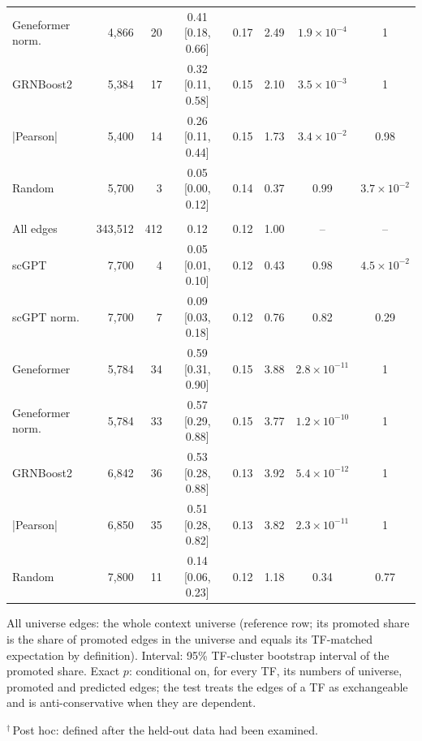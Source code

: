\begin{table}[tbp]
\begin{tabular}{@{}lrrcrccc@{}}
Geneformer norm. & 4{,}866 & 20 & 0.41 [0.18, 0.66] & 0.17 & 2.49 & $1.9\times 10^{-4}$ & 1 \\
GRNBoost2 & 5{,}384 & 17 & 0.32 [0.11, 0.58] & 0.15 & 2.10 & $3.5\times 10^{-3}$ & 1 \\
|Pearson| & 5{,}400 & 14 & 0.26 [0.11, 0.44] & 0.15 & 1.73 & $3.4\times 10^{-2}$ & 0.98 \\
Random & 5{,}700 & 3 & 0.05 [0.00, 0.12] & 0.14 & 0.37 & 0.99 & $3.7\times 10^{-2}$ \\
\addlinespace[3pt]
\multicolumn{8}{@{}l}{\emph{Lung}} \\
All edges & 343{,}512 & 412 & 0.12 & 0.12 & 1.00 & -- & -- \\
scGPT & 7{,}700 & 4 & 0.05 [0.01, 0.10] & 0.12 & 0.43 & 0.98 & $4.5\times 10^{-2}$ \\
scGPT norm. & 7{,}700 & 7 & 0.09 [0.03, 0.18] & 0.12 & 0.76 & 0.82 & 0.29 \\
Geneformer & 5{,}784 & 34 & 0.59 [0.31, 0.90] & 0.15 & 3.88 & $2.8\times 10^{-11}$ & 1 \\
Geneformer norm. & 5{,}784 & 33 & 0.57 [0.29, 0.88] & 0.15 & 3.77 & $1.2\times 10^{-10}$ & 1 \\
GRNBoost2 & 6{,}842 & 36 & 0.53 [0.28, 0.88] & 0.13 & 3.92 & $5.4\times 10^{-12}$ & 1 \\
|Pearson| & 6{,}850 & 35 & 0.51 [0.28, 0.82] & 0.13 & 3.82 & $2.3\times 10^{-11}$ & 1 \\
Random & 7{,}800 & 11 & 0.14 [0.06, 0.23] & 0.12 & 1.18 & 0.34 & 0.77 \\
\bottomrule
\end{tabular}
\par\smallskip
\begin{minipage}{\linewidth}\footnotesize
All universe edges: the whole context universe (reference row; its promoted share is the share of promoted edges in the universe and equals its TF-matched expectation by definition). Interval: 95\% TF-cluster bootstrap interval of the promoted share. Exact $p$: conditional on, for every TF, its numbers of universe, promoted and predicted edges; the test treats the edges of a TF as exchangeable and is anti-conservative when they are dependent.

$^{\dagger}$\,Post hoc: defined after the held-out data had been examined.
\end{minipage}
\end{table}
